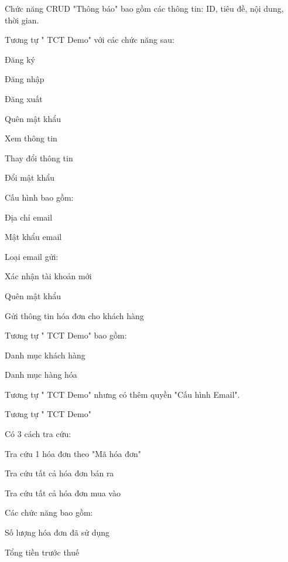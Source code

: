 



Chức năng CRUD "Thông báo" bao gồm các thông tin: ID, tiêu đề, nội dung, thời gian.


Tương tự " TCT Demo" với các chức năng sau:

Đăng ký

Đăng nhập

Đăng xuất

Quên mật khẩu

Xem thông tin

Thay đổi thông tin

Đổi mật khẩu


Cấu hình bao gồm:

Địa chỉ email

Mật khẩu email

Loại email gửi:

Xác nhận tài khoản mới

Quên mật khẩu

Gửi thông tin hóa đơn cho khách hàng


Tương tự " TCT Demo" bao gồm:

Danh mục khách hàng

Danh mục hàng hóa


Tương tự " TCT Demo" nhưng có thêm quyền "Cấu hình Email".


Tương tự " TCT Demo"


Có 3 cách tra cứu:

Tra cứu 1 hóa đơn theo "Mã hóa đơn"

Tra cứu tất cả hóa đơn bán ra

Tra cứu tất cả hóa đơn mua vào


Các chức năng bao gồm:

Số lượng hóa đơn đã sử dụng

Tổng tiền trước thuế


